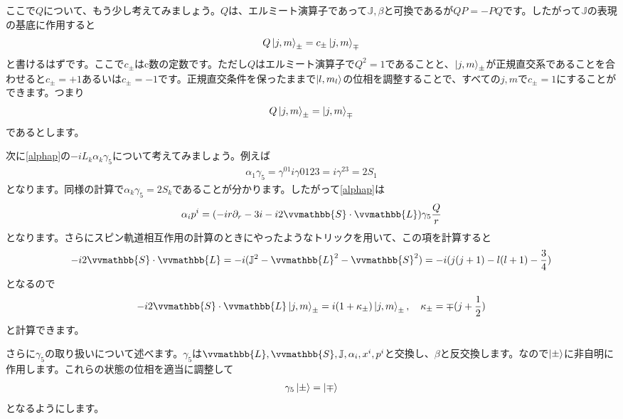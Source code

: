\documentclass[report,paper=a4, fontsize=12pt, line_length=16cm, number_of_lines=33,dvipdfmx]{jlreq}
\numberwithin{equation}{chapter}
\newcommand{\del}{\partial}
\newcommand{\Lb}{\vvmathbb{L}}
\newcommand{\Sb}{\vvmathbb{S}}
\newcommand{\Jb}{\mathbb{J}}
\newcommand{\ml}{m_{l}}
\begin{document}
ここで$Q$について、もう少し考えてみましょう。$Q$は、エルミート演算子であって$\Jb,\beta$と可換であるが$QP=-PQ$です。したがって$\Jb$の表現の基底に作用すると
\begin{align*}
  Q\ket{j,m}_{\pm}=c_{\pm}\ket{j,m}_{\mp}
\end{align*}
と書けるはずです。ここで$c_{\pm}$はc数の定数です。ただし$Q$はエルミート演算子で$Q^2=1$であることと、$\ket{j,m}_{\pm}$が正規直交系であることを合わせると$c_{\pm}=+1$あるいは$c_{\pm}=-1$です。正規直交条件を保ったままで$\ket{l,\ml}$の位相を調整することで、すべての$j,m$で$c_{\pm}=1$にすることができます。つまり
\begin{align*}
  Q\ket{j,m}_{\pm}=\ket{j,m}_{\mp}
\end{align*}
であるとします。

次に\eqref{alphap}の$-iL_{k}\alpha_{k}\gamma_5$について考えてみましょう。例えば
\begin{align*}
  \alpha_1\gamma_5=\gamma^{01}i\gamma{0123}=i\gamma^{23}=2S_{1}
\end{align*}
となります。同様の計算で$\alpha_{k}\gamma_{5}=2S_{k}$であることが分かります。したがって\eqref{alphap}は
\begin{align}
  \alpha_ip^i=(-ir\del_{r}-3i-i2\Sb\cdot \Lb)\gamma_5\frac{Q}{r}
  \label{alphap2}
\end{align}
となります。さらにスピン軌道相互作用の計算のときにやったようなトリックを用いて、この項を計算すると
\begin{align*}
  -i2\Sb\cdot\Lb=-i(\Jb^2-\Lb^2-\Sb^2)=-i(j(j+1)-l(l+1)-\frac34)
\end{align*}
となるので
\begin{align*}
  -i2\Sb\cdot\Lb\ket{j,m}_{\pm}=i(1+\kappa_{\pm})\ket{j,m}_{\pm},\quad
  \kappa_{\pm}=\mp(j+\frac12)
\end{align*}
と計算できます。

さらに$\gamma_5$の取り扱いについて述べます。$\gamma_5$は$\Lb,\Sb,\Jb,\alpha_i,x^i,p^i$と交換し、$\beta$と反交換します。なので$\ket{\pm}$に非自明に作用します。これらの状態の位相を適当に調整して
\begin{align*}
  \gamma_5\ket{\pm}=\ket{\mp}
\end{align*}
となるようにします。
\end{document}
